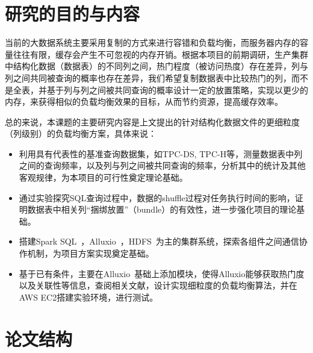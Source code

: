\section{研究的目的与内容}
当前的大数据系统主要采用复制的方式来进行容错和负载均衡，而服务器内存的容量往往有限，缓存会产生不可忽视的内存开销。根据本项目的前期调研，生产集群中结构化数据（数据表）的不同列之间，热门程度（被访问热度）存在差异，列与列之间共同被查询的概率也存在差异，我们希望复制数据表中比较热门的列，而不是全表，并基于列与列之间被共同查询的概率设计一定的放置策略，实现以更少的内存，来获得相似的负载均衡效果的目标，从而节约资源，提高缓存效率。

总的来说，本课题的主要研究内容是上文提出的针对结构化数据文件的更细粒度（列级别）的负载均衡方案，具体来说：

\begin{itemize}
	\item 利用具有代表性的基准查询数据集，如TPC-DS, TPC-H等，测量数据表中列之间的查询频率，以及列与列之间被共同查询的频率，分析其中的统计及其他客观规律，为本项目的可行性奠定理论基础。
	\item 通过实验探究SQL查询过程中，数据的shuffle过程对任务执行时间的影响，证明数据表中相关列“捆绑放置”（bundle）的有效性，进一步强化项目的理论基础。
	\item 搭建Spark SQL~\cite{armbrust2015spark}，Alluxio~\cite{alluxio}，HDFS~\cite{shvachko2010hadoop}为主的集群系统，探索各组件之间通信协作机制，为项目方案实现奠定基础。
	\item 基于已有条件，主要在Alluxio~\cite{alluxio}基础上添加模块，使得Alluxio能够获取热门度以及关联性等信息，查阅相关文献，设计实现细粒度的负载均衡算法，并在AWS EC2搭建实验环境，进行测试。
\end{itemize}

\section{论文结构}


